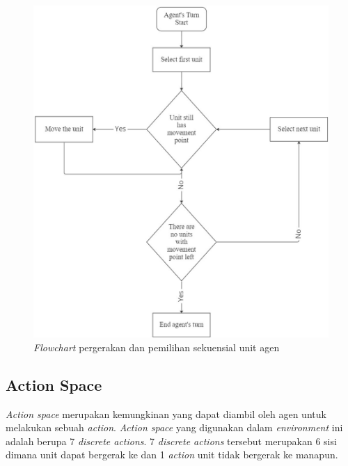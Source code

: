 \begin{figure}[H]
  \centering
    \includegraphics[scale=0.48]{gambar/unit_sequential_movement.jpg}
    \caption{\emph{Flowchart} pergerakan dan pemilihan sekuensial unit agen}
    \label{fig:sequentialMovementFlowchart}
\end{figure}

\subsection{Action Space}
\emph{Action space} merupakan kemungkinan yang dapat diambil oleh agen untuk melakukan sebuah \emph{action}.
\emph{Action space} yang digunakan dalam \emph{environment} ini adalah berupa 7 \emph{discrete actions}.
7 \emph{discrete actions} tersebut merupakan 6 sisi dimana unit dapat bergerak ke dan 1 \emph{action} unit tidak bergerak ke manapun.

